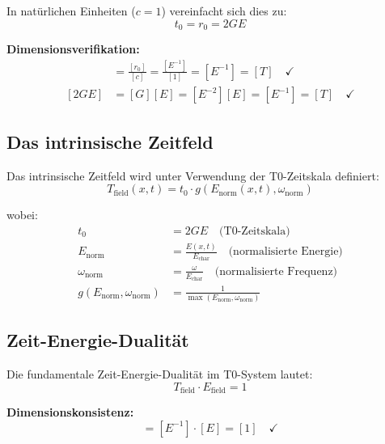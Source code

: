 \documentclass[12pt,a4paper]{report}
\newcommand{\rzero}{r_0}                  %
\newcommand{\tzero}{t_0}                  %
\begin{document}
	In natürlichen Einheiten ($c = 1$) vereinfacht sich dies zu:
	\begin{equation}
		\tzero = \rzero = 2GE
	\end{equation}
	
	\textbf{Dimensionsverifikation:}
	\begin{align}
		[\tzero] &= \frac{[\rzero]}{[c]} = \frac{[E^{-1}]}{[1]} = [E^{-1}] = [T] \quad \checkmark \\
		[2GE] &= [G][E] = [E^{-2}][E] = [E^{-1}] = [T] \quad \checkmark
	\end{align}
	
	\subsection{Das intrinsische Zeitfeld}\label{subsec:time_field_definition}
	
	Das intrinsische Zeitfeld wird unter Verwendung der T0-Zeitskala definiert:
	\begin{equation}
		\boxed{T_{\text{field}}(x,t) = \tzero \cdot g(E_{\text{norm}}(x,t), \omega_{\text{norm}})}
		\label{eq:time_field_normalized}
	\end{equation}
	
	wobei:
	\begin{align}
		\tzero &= 2GE \quad \text{(T0-Zeitskala)} \\
		E_{\text{norm}} &= \frac{E(x,t)}{E_{\text{char}}} \quad \text{(normalisierte Energie)} \\
		\omega_{\text{norm}} &= \frac{\omega}{E_{\text{char}}} \quad \text{(normalisierte Frequenz)} \\
		g(E_{\text{norm}}, \omega_{\text{norm}}) &= \frac{1}{\max(E_{\text{norm}}, \omega_{\text{norm}})}
	\end{align}
	
	\subsection{Zeit-Energie-Dualität}
	
	Die fundamentale Zeit-Energie-Dualität im T0-System lautet:
	\begin{equation}
		\boxed{T_{\text{field}} \cdot E_{\text{field}} = 1}
		\label{eq:time_energy_duality}
	\end{equation}
	
	\textbf{Dimensionskonsistenz:}
	\begin{equation}
		[T_{\text{field}} \cdot E_{\text{field}}] = [E^{-1}] \cdot [E] = [1] \quad \checkmark
	\end{equation}
	
\end{document}
